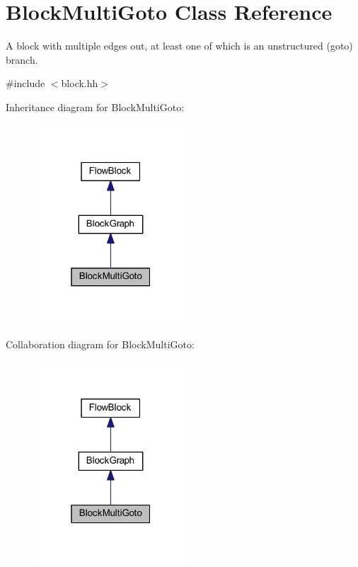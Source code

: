 \hypertarget{class_block_multi_goto}{}\section{Block\+Multi\+Goto Class Reference}
\label{class_block_multi_goto}


A block with multiple edges out, at least one of which is an unstructured (goto) branch.  




{\ttfamily \#include $<$block.\+hh$>$}



Inheritance diagram for Block\+Multi\+Goto\+:
\nopagebreak
\begin{figure}[H]
\begin{center}
\leavevmode
\includegraphics[width=163pt]{class_block_multi_goto__inherit__graph}
\end{center}
\end{figure}


Collaboration diagram for Block\+Multi\+Goto\+:
\nopagebreak
\begin{figure}[H]
\begin{center}
\leavevmode
\includegraphics[width=163pt]{class_block_multi_goto__coll__graph}
\end{center}
\end{figure}
